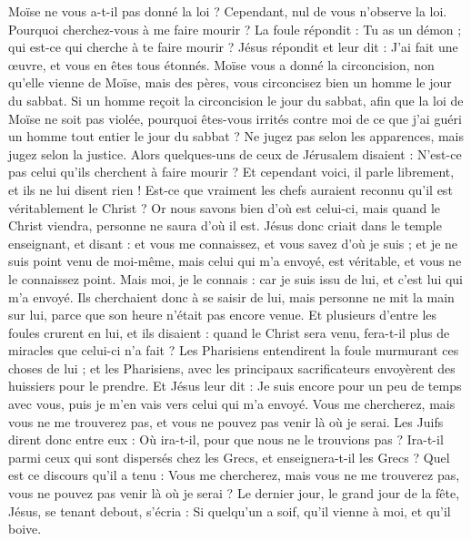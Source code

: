 \begin{multicols}{2}
Moïse ne vous a-t-il pas donné la loi ? Cependant, nul de vous n'observe la loi. Pourquoi cherchez-vous à me faire mourir ?
La foule répondit : Tu as un démon ; qui est-ce qui cherche à te faire mourir ?
Jésus répondit et leur dit : J'ai fait une œuvre, et vous en êtes tous étonnés.
Moïse vous a donné la circoncision, non qu'elle vienne de Moïse, mais des pères, vous circoncisez bien un homme le jour du sabbat.
Si un homme reçoit la circoncision le jour du sabbat, afin que la loi de Moïse ne soit pas violée, pourquoi êtes-vous irrités contre moi de ce que j'ai guéri un homme tout entier le jour du sabbat ?
Ne jugez pas selon les apparences, mais jugez selon la justice.
Alors quelques-uns de ceux de Jérusalem disaient : N'est-ce pas celui qu'ils cherchent à faire mourir ?
Et cependant voici, il parle librement, et ils ne lui disent rien ! Est-ce que vraiment les chefs auraient reconnu qu'il est véritablement le Christ ?
Or nous savons bien d'où est celui-ci, mais quand le Christ viendra, personne ne saura d'où il est.
Jésus donc criait dans le temple enseignant, et disant : et vous me connaissez, et vous savez d'où je suis ; et je ne suis point venu de moi-même, mais celui qui m'a envoyé, est véritable, et vous ne le connaissez point. 
Mais moi, je le connais : car je suis issu de lui, et c'est lui qui m'a envoyé.
Ils cherchaient donc à se saisir de lui, mais personne ne mit la main sur lui, parce que son heure n'était pas encore venue.
Et plusieurs d'entre les foules crurent en lui, et ils disaient : quand le Christ sera venu, fera-t-il plus de miracles que celui-ci n'a fait ?
Les Pharisiens entendirent la foule murmurant ces choses de lui ; et les Pharisiens, avec les principaux sacrificateurs envoyèrent des huissiers pour le prendre.
Et Jésus leur dit : Je suis encore pour un peu de temps avec vous, puis je m'en vais vers celui qui m'a envoyé.
Vous me chercherez, mais vous ne me trouverez pas, et vous ne pouvez pas venir là où je serai.
Les Juifs dirent donc entre eux : Où ira-t-il, pour que nous ne le trouvions pas ? Ira-t-il parmi ceux qui sont dispersés chez les Grecs, et enseignera-t-il les Grecs ?
Quel est ce discours qu'il a tenu : Vous me chercherez, mais vous ne me trouverez pas, vous ne pouvez pas venir là où je serai ?
Le dernier jour, le grand jour de la fête, Jésus, se tenant debout, s'écria : Si quelqu'un a soif, qu'il vienne à moi, et qu'il boive.

\end{multicols}
